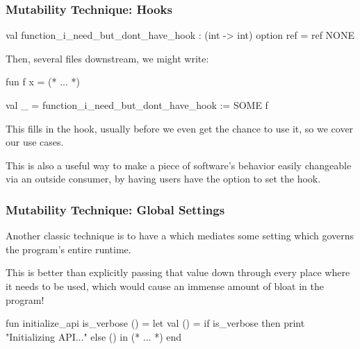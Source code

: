 \documentclass[aspectratio=169]{beamer}
\begin{document}
\begin{frame}[fragile]
  \frametitle{Mutability Technique: Hooks}


  \pause
  \vspace{\fill}

  \begin{codeblock}
    val function_i_need_but_dont_have_hook :
      (int -> int) option ref = ref NONE
  \end{codeblock}

  \pause
  \vspace{\fill}

  Then, several files downstream, we might write:
  \begin{codeblock}
    fun f x = (* ... *)

    val _ = function_i_need_but_dont_have_hook := SOME f
  \end{codeblock}

  \pause
  \vspace{\fill}

  This fills in the hook, usually before we even get the chance to use it, so
  we cover our use cases.

  \pause
  \vspace{\fill}

  This is also a useful way to make a piece of software's behavior easily
  changeable via an outside consumer, by having users have the option to
  set the hook.
\end{frame}

\begin{frame}[fragile]
  \frametitle{Mutability Technique: Global Settings}

  Another classic technique is to have a  which mediates some
  setting which governs the program's entire runtime.

  \pause
  \vspace{\fill}

  This is better than explicitly passing that value down through every place where
  it needs to be used, which would cause an immense amount of bloat in the program!

  \pause
  \vspace{\fill}

  \begin{codeblock}
    fun initialize_api is_verbose () =
      let
        val () = if is_verbose then
                   print "Initializing API...\n"
                 else ()
      in
        (* ... *)
      end
  \end{codeblock}
\end{frame}
\end{document}
